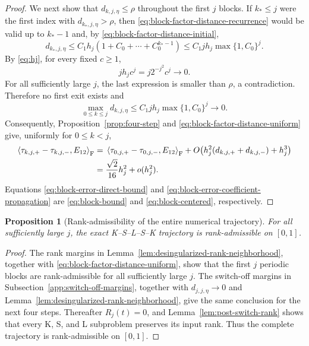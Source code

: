 \documentclass[]{article}
\numberwithin{equation}{section}
\theoremstyle{plain}
\newtheorem{proposition}[theorem]{Proposition}
\theoremstyle{remark}
\newcommand{\F}{\mathrm F}
\newcommand{\ip}[2]{\left\langle #1,#2\right\rangle_{\F}}
\begin{document}
\begin{proof}
We next show that $d_{k,j,\eta}\le\rho$ throughout the first
$j$ blocks.  If $k_*\le j$ were the first index
with $d_{k_*,j,\eta}>\rho$, then
\eqref{eq:block-factor-distance-recurrence} would be valid up to
$k_*-1$ and, by \eqref{eq:block-factor-distance-initial},
\begin{equation}\label{eq:block-factor-distance-convergence}
 d_{k_*,j,\eta}
 \le C_1h_j(1+C_0+\cdots+C_0^{k_*-1})
 \le C_1jh_j\max\{1,C_0\}^{j}.
\end{equation}
By \eqref{eq:hj}, for every fixed $c\ge1$,
\[
 jh_jc^j=j2^{-j^2}c^j\longrightarrow0.
\]
For all sufficiently large $j$, the last expression is smaller than
$\rho$, a contradiction.  Therefore no first exit exists and
\begin{equation}\label{eq:block-factor-distance-uniform}
 \max_{0\le k\le j}d_{k,j,\eta}
 \le C_1jh_j\max\{1,C_0\}^{j}\longrightarrow0.
\end{equation}
Consequently, Proposition~\ref{prop:four-step} and
\eqref{eq:block-factor-distance-uniform} give, uniformly for
$0\le k<j$,
\begin{align}
 \ip{\tau_{k,j,+}-\tau_{k,j,-}}{E_{12}}
 &={}
 \ip{\tau_{0,j,+}-\tau_{0,j,-}}{E_{12}}
 +O\!\left(h_j^2(d_{k,j,+}+d_{k,j,-})+h_j^3\right)\notag\\
 &=\frac{\sqrt2}{16}h_j^2+o(h_j^2).
 \label{eq:block-error-coefficient-propagation}
\end{align}
Equations \eqref{eq:block-error-direct-bound} and
\eqref{eq:block-error-coefficient-propagation} are
\eqref{eq:block-bound} and \eqref{eq:block-centered}, respectively.
\end{proof}

\begin{proposition}[Rank-admissibility of the entire numerical trajectory]
\label{prop:full-rank-admissibility}
For all sufficiently large $j$, the exact K--S--L--S--K trajectory is
rank-admissible on $[0,1]$.
\end{proposition}

\begin{proof}
The rank margins in Lemma~\ref{lem:desingularized-rank-neighborhood}, together
with \eqref{eq:block-factor-distance-uniform}, show that the first $j$
periodic blocks are rank-admissible for all sufficiently large $j$.
The switch-off margins in
Subsection~\ref{app:switch-off-margins}, together with
$d_{j,j,\eta}\to0$ and
Lemma~\ref{lem:desingularized-rank-neighborhood}, give the same
conclusion for the next four steps.  Thereafter $R_j(t)=0$, and
Lemma~\ref{lem:post-switch-rank} shows that every K, S, and L subproblem
preserves its input rank.  Thus the complete trajectory is
rank-admissible on $[0,1]$.
\end{proof}
\end{document}
